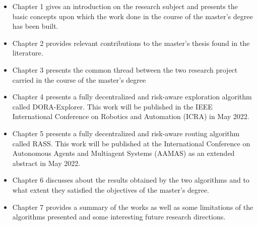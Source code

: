 \begin{itemize}
    \item Chapter 1 gives an introduction on the research subject and presents the basic concepts upon which the work done in the course of the master's degree has been built. 
    \item Chapter 2 provides relevant contributions to the master's thesis found in the literature.
    \item Chapter 3 presents the common thread between the two research project carried in the course of the master's degree
    \item Chapter 4 presents a fully decentralized and risk-aware exploration algorithm called DORA-Explorer. This work will be published in the IEEE International Conference on Robotics and Automation (ICRA) in May 2022.
    \item Chapter 5 presents a fully decentralized and risk-aware routing algorithm called RASS. This work will be published at the International Conference on Autonomous Agents and Multiagent Systems (AAMAS) as an extended abstract in May 2022. 
    \item Chapter 6 discusses about the results obtained by the two algorithms and to what extent they satisfied the objectives of the master's degree. 
    \item Chapter 7 provides a summary of the works as well as some limitations of the algorithms presented and some interesting future research directions.
\end{itemize}



